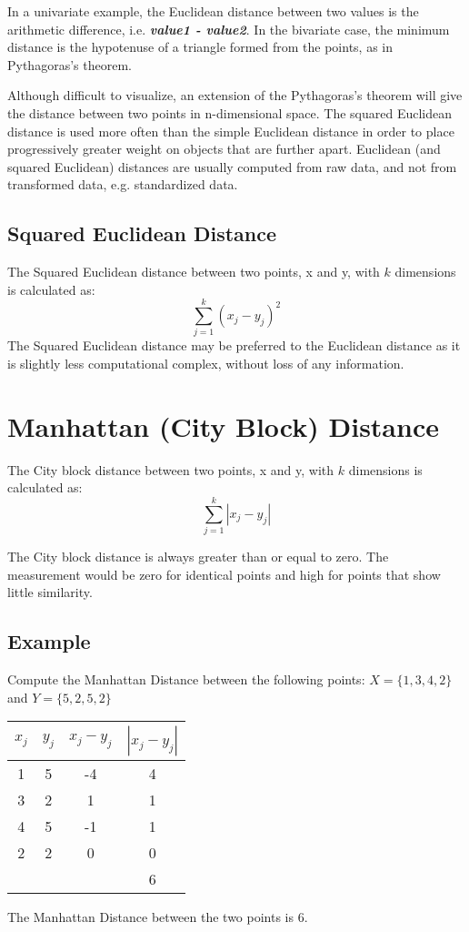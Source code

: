 In a univariate example, the Euclidean distance between two values is the arithmetic difference, i.e. \textbf{\textit{value1 - value2}}. In the bivariate case, the minimum distance is the hypotenuse of a triangle formed from the points, as in Pythagoras's theorem.

Although difficult to visualize, an extension of the Pythagoras's theorem will give the distance between two points in n-dimensional space. The squared Euclidean distance is used more often than the simple Euclidean distance in order to place progressively greater weight on objects that are further apart. Euclidean (and squared Euclidean) distances are usually computed from raw data, and not from transformed data, e.g. standardized data.
\newpage

\subsection{Squared Euclidean Distance}
The Squared Euclidean distance between two points, x and y, with $k$ dimensions is calculated as:
\[ \sum^{k}_{j=1} ( x_j - y_j)^2  \]
The Squared Euclidean distance may be preferred to the Euclidean distance as it is slightly less computational complex, without loss of any information.
\newpage

\section{Manhattan (City Block) Distance}
The City block distance between two points, x and y, with $k$ dimensions is calculated as:
\[ \sum^{k}_{j=1} | x_j - y_j |  \]

The City block distance is always greater than or equal to zero. The measurement would be zero for identical points and high for points that show little similarity.

\subsection{Example}
Compute the Manhattan Distance between the following points: 
$X = \{1,3,4,2\}$ and $Y = \{5,2,5,2\}$


\begin{center}
	\begin{tabular}{|c|c|c|c|}
		\hline
		$x_j$	&	$y_j$	&   $x_j - y_j$	&	$| x_j - y_j |$	\\ \hline
		1	&	5	&	-4	&	4	\\
		3	&	2	&	1	&	1	\\
		4	&	5	&	-1	&	1	\\
		2	&	2	&	0	&	0	\\ \hline
		& & & 6 \\
		\hline
	\end{tabular}
\end{center}
The Manhattan Distance between the two points is 6.

